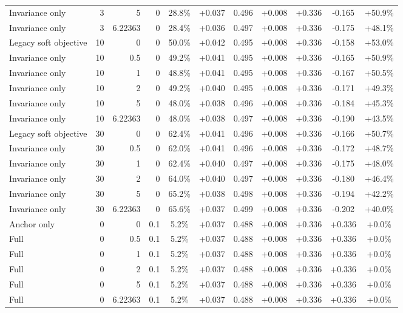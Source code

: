 \begin{table}[htbp]
\begin{tabular}{lrrrccccccc}
Invariance only & 3 & 5 & 0 & 28.8\% & +0.037 & 0.496 & +0.008 & +0.336 & -0.165 & +50.9\% \\
Invariance only & 3 & 6.22363 & 0 & 28.4\% & +0.036 & 0.497 & +0.008 & +0.336 & -0.175 & +48.1\% \\
Legacy soft objective & 10 & 0 & 0 & 50.0\% & +0.042 & 0.495 & +0.008 & +0.336 & -0.158 & +53.0\% \\
Invariance only & 10 & 0.5 & 0 & 49.2\% & +0.041 & 0.495 & +0.008 & +0.336 & -0.165 & +50.9\% \\
Invariance only & 10 & 1 & 0 & 48.8\% & +0.041 & 0.495 & +0.008 & +0.336 & -0.167 & +50.5\% \\
Invariance only & 10 & 2 & 0 & 49.2\% & +0.040 & 0.495 & +0.008 & +0.336 & -0.171 & +49.3\% \\
Invariance only & 10 & 5 & 0 & 48.0\% & +0.038 & 0.496 & +0.008 & +0.336 & -0.184 & +45.3\% \\
Invariance only & 10 & 6.22363 & 0 & 48.0\% & +0.038 & 0.497 & +0.008 & +0.336 & -0.190 & +43.5\% \\
Legacy soft objective & 30 & 0 & 0 & 62.4\% & +0.041 & 0.496 & +0.008 & +0.336 & -0.166 & +50.7\% \\
Invariance only & 30 & 0.5 & 0 & 62.0\% & +0.041 & 0.496 & +0.008 & +0.336 & -0.172 & +48.7\% \\
Invariance only & 30 & 1 & 0 & 62.4\% & +0.040 & 0.497 & +0.008 & +0.336 & -0.175 & +48.0\% \\
Invariance only & 30 & 2 & 0 & 64.0\% & +0.040 & 0.497 & +0.008 & +0.336 & -0.180 & +46.4\% \\
Invariance only & 30 & 5 & 0 & 65.2\% & +0.038 & 0.498 & +0.008 & +0.336 & -0.194 & +42.2\% \\
Invariance only & 30 & 6.22363 & 0 & 65.6\% & +0.037 & 0.499 & +0.008 & +0.336 & -0.202 & +40.0\% \\
Anchor only & 0 & 0 & 0.1 & 5.2\% & +0.037 & 0.488 & +0.008 & +0.336 & +0.336 & +0.0\% \\
Full & 0 & 0.5 & 0.1 & 5.2\% & +0.037 & 0.488 & +0.008 & +0.336 & +0.336 & +0.0\% \\
Full & 0 & 1 & 0.1 & 5.2\% & +0.037 & 0.488 & +0.008 & +0.336 & +0.336 & +0.0\% \\
Full & 0 & 2 & 0.1 & 5.2\% & +0.037 & 0.488 & +0.008 & +0.336 & +0.336 & +0.0\% \\
Full & 0 & 5 & 0.1 & 5.2\% & +0.037 & 0.488 & +0.008 & +0.336 & +0.336 & +0.0\% \\
Full & 0 & 6.22363 & 0.1 & 5.2\% & +0.037 & 0.488 & +0.008 & +0.336 & +0.336 & +0.0\% \\

\end{tabular}
\end{table}
